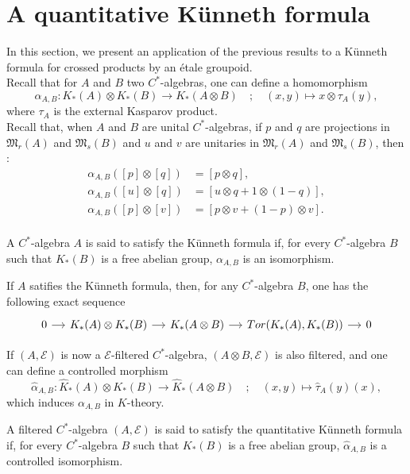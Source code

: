 \section{A quantitative Künneth formula}

In this section, we present an application of the previous results to a Künneth formula for crossed products by an étale groupoid.\\ 

Recall that for $A$ and $B$ two $C^*$-algebras, one can define a homomorphism
\[\alpha_{A,B} : K_*(A)\otimes K_*(B)\rightarrow K_*(A\otimes B) \quad ; \quad (x,y)\mapsto x\otimes   \tau_A(y),\]
where $\tau_A$ is the external Kasparov product.\\

Recall that, when $A$ and $B$ are unital $C^*$-algebras, if $p$ and $q$ are projections in $\mathfrak M_r(A)$ and $\mathfrak M_s(B)$ and $u$ and $v$ are unitaries in $\mathfrak M_r(A)$ and $\mathfrak M_s(B)$, then :
\[\begin{array}{rl}
\alpha_{A,B}([p]\otimes [q]) & = [p\otimes q], \\
\alpha_{A,B}([u]\otimes [q]) & = [u \otimes q +1\otimes (1-q)], \\
\alpha_{A,B}([p]\otimes [v]) & = [p\otimes v +(1-p)\otimes v] .\\
\end{array}\]

\begin{definition}
A $C^*$-algebra $A$ is said to satisfy the Künneth formula if, for every $C^*$-algebra $B$ such that $K_*(B)$ is a free abelian group, $\alpha_{A,B}$ is an isomorphism.
\end{definition}

If $A$ satifies the Künneth formula, then, for any $C^*$-algebra $B$, one has the following exact sequence
\[\begin{tikzcd}[column sep = small] 0 \arrow{r} & K_*(A)\otimes K_*(B)\arrow{r} & K_*(A\otimes B) \arrow{r} & Tor(K_*(A),K_*(B))\arrow{r} & 0 \end{tikzcd}\]

If $(A,\mathcal E)$ is now a $\mathcal E$-filtered $C^*$-algebra, $(A\otimes B,\mathcal E)$ is also filtered, and one can define a controlled morphism
\[\hat\alpha_{A,B} : \hat K_*(A)\otimes K_*(B)\rightarrow \hat K_*(A\otimes B) \quad ; \quad (x,y)\mapsto \hat\tau_A(y)(x),\]
which induces $\alpha_{A,B}$ in $K$-theory. \\

\begin{definition}
A filtered $C^*$-algebra $(A,\mathcal E)$ is said to satisfy the quantitative Künneth formula if, for every $C^*$-algebra $B$ such that $K_*(B)$ is a free abelian group, $\hat\alpha_{A,B}$ is a controlled isomorphism.
\end{definition}

